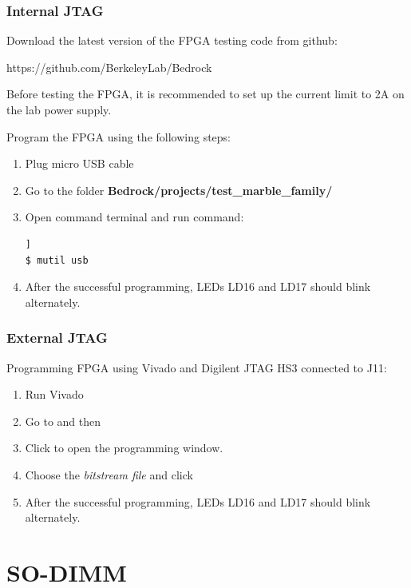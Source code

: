 \documentclass[12pt,oneside,a4]{article}
\begin{document}
\subsubsection{Internal JTAG}
Download the latest version of the FPGA testing code from github:
\begin{leftbar}
https://github.com/BerkeleyLab/Bedrock
\end{leftbar}

\begin{leftbar}
Before testing the FPGA, it is recommended to set up the current limit to 2A on the lab power supply.
\end{leftbar}

Program the FPGA using the following steps:
\begin{enumerate}
	\item Plug micro USB cable
	\item Go to the folder \textbf{Bedrock/projects/test\_marble\_family/}
	\item Open command terminal and run command:
	\begin{lstlisting}[backgroundcolor = \color{Gainsboro}, language=bash, frame=none]]
$ mutil usb
	\end{lstlisting}
	\item After the successful programming, LEDs LD16 and LD17 should blink alternately.
\end{enumerate}

\subsubsection{External JTAG}
Programming FPGA using Vivado and Digilent JTAG HS3 connected to J11:
\begin{enumerate}
		\item Run Vivado
		\item Go to  and then  
		\item Click  to open the programming window.
		\item Choose the \textit{bitstream file} and click 

	\item After the successful programming, LEDs LD16 and LD17 should blink alternately.
\end{enumerate}

\section{SO-DIMM}
\end{document}
